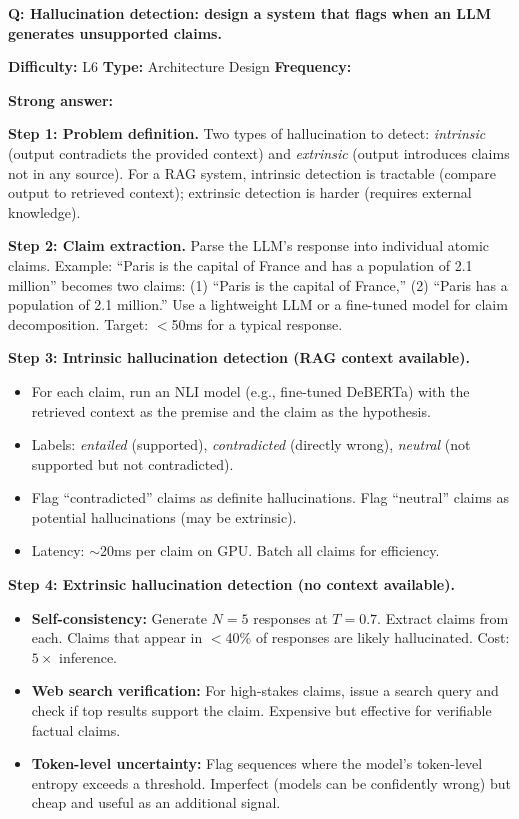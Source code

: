 
\begin{interviewq}
\textbf{Q: Hallucination detection: design a system that flags when an LLM generates unsupported claims.}

\textbf{Difficulty:} L6 \quad \textbf{Type:} Architecture Design \quad \textbf{Frequency:} \freqmed{}

\textbf{Strong answer:}

\textbf{Step 1: Problem definition.} Two types of hallucination to detect: \textit{intrinsic} (output contradicts the provided context) and \textit{extrinsic} (output introduces claims not in any source). For a RAG system, intrinsic detection is tractable (compare output to retrieved context); extrinsic detection is harder (requires external knowledge).

\textbf{Step 2: Claim extraction.} Parse the LLM's response into individual atomic claims. Example: ``Paris is the capital of France and has a population of 2.1 million'' becomes two claims: (1) ``Paris is the capital of France,'' (2) ``Paris has a population of 2.1 million.'' Use a lightweight LLM or a fine-tuned model for claim decomposition. Target: $<$50ms for a typical response.

\textbf{Step 3: Intrinsic hallucination detection (RAG context available).}
\begin{itemize}
    \item For each claim, run an NLI model (e.g., fine-tuned DeBERTa) with the retrieved context as the premise and the claim as the hypothesis.
    \item Labels: \textit{entailed} (supported), \textit{contradicted} (directly wrong), \textit{neutral} (not supported but not contradicted).
    \item Flag ``contradicted'' claims as definite hallucinations. Flag ``neutral'' claims as potential hallucinations (may be extrinsic).
    \item Latency: $\sim$20ms per claim on GPU. Batch all claims for efficiency.
\end{itemize}

\textbf{Step 4: Extrinsic hallucination detection (no context available).}
\begin{itemize}
    \item \textbf{Self-consistency:} Generate $N = 5$ responses at $T = 0.7$. Extract claims from each. Claims that appear in $<$40\% of responses are likely hallucinated. Cost: $5\times$ inference.
    \item \textbf{Web search verification:} For high-stakes claims, issue a search query and check if top results support the claim. Expensive but effective for verifiable factual claims.
    \item \textbf{Token-level uncertainty:} Flag sequences where the model's token-level entropy exceeds a threshold. Imperfect (models can be confidently wrong) but cheap and useful as an additional signal.
\end{itemize}


\end{interviewq}
